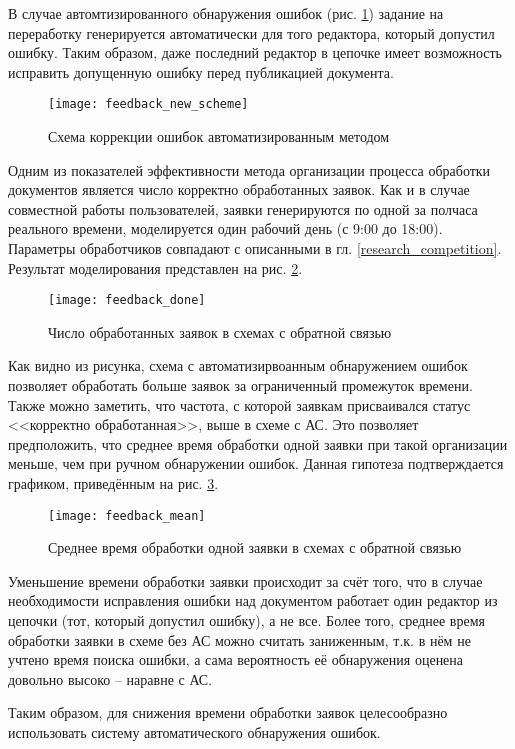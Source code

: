 \vspace{\baselineskip}
В случае автомтизированного обнаружения ошибок (рис. \ref{img:feedback_new_scheme}) задание на переработку генерируется автоматически для того редактора, который допустил ошибку. Таким образом, даже последний редактор в цепочке имеет возможность исправить допущенную ошибку перед публикацией документа.

\begin{figure}[h!]
  \centering
  \texttt{[image: feedback\_new\_scheme]}
  \caption{Схема коррекции ошибок автоматизированным методом}
  \label{img:feedback_new_scheme}
\end{figure}

\vspace{\baselineskip}
Одним из показателей эффективности метода организации процесса обработки документов является число корректно обработанных заявок. Как и в случае совместной работы пользователей, заявки генерируются по одной за полчаса реального времени, моделируется один рабочий день (с 9:00 до 18:00). Параметры обработчиков совпадают с описанными в гл. \ref{research_competition}. Результат моделирования представлен на рис. \ref{img:feedback_done}.

\begin{figure}[h!]
  \centering
  \texttt{[image: feedback\_done]}
  \caption{Число обработанных заявок в схемах с обратной связью}
  \label{img:feedback_done}
\end{figure}

\vspace{\baselineskip}
Как видно из рисунка, схема с автоматизирвоанным обнаружением ошибок позволяет обработать больше заявок за ограниченный промежуток времени. Также можно заметить, что частота, с которой заявкам присваивался статус <<корректно обработанная>>, выше в схеме с АС. Это позволяет предположить, что среднее время обработки одной заявки при такой организации меньше, чем при ручном обнаружении ошибок. Данная гипотеза подтверждается графиком, приведённым на рис. \ref{img:feedback_mean}.

\begin{figure}[h!]
  \centering
  \texttt{[image: feedback\_mean]}
  \caption{Среднее время обработки одной заявки в схемах с обратной связью}
  \label{img:feedback_mean}
\end{figure}

\vspace{\baselineskip}
Уменьшение времени обработки заявки происходит за счёт того, что в случае необходимости исправления ошибки над документом работает один редактор из цепочки (тот, который допустил ошибку), а не все. Более того, среднее время обработки заявки в схеме без АС можно считать заниженным, т.к. в нём не учтено время поиска ошибки, а сама вероятность её обнаружения оценена довольно высоко -- наравне с АС. 

\vspace{\baselineskip}
Таким образом, для снижения времени обработки заявок целесообразно использовать систему автоматического обнаружения ошибок.